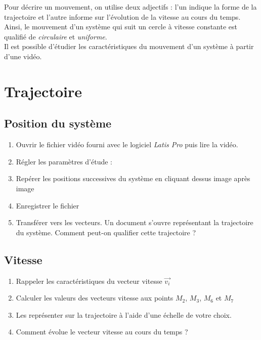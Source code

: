 \documentclass[a4paper,11pt,fleqn]{article}%
\begin{document}
\maketitle

Pour décrire un mouvement, on utilise deux adjectifs : l'un indique la forme de la trajectoire et l'autre informe sur l'évolution de la vitesse au cours du temps. Ainsi, le mouvement d'un système qui suit un cercle à vitesse constante est qualifié de \textit{circulaire} et \textit{uniforme}.\\ Il est possible d'étudier les caractéristiques du mouvement d'un système à partir d'une vidéo.
\section{Trajectoire}
	\subsection*{Position du système}
	\begin{enumerate}
		\item Ouvrir le fichier vidéo fourni avec le logiciel \textit{Latis Pro} puis lire la vidéo.
		\item Régler les paramètres d'étude :
		\item Repérer les positions successives du système en cliquant dessus image après image
		\item Enregistrer le fichier
		\item Transférer vers les vecteurs. Un document s'ouvre représentant la trajectoire du système. Comment peut-on qualifier cette trajectoire ?
	\end{enumerate}
	\subsection*{Vitesse}
	\begin{enumerate}[resume]
	\item Rappeler les caractéristiques du vecteur vitesse $\vec{v_i}$
	\item Calculer les valeurs des vecteurs vitesse aux points $M_2$, $M_3$, $M_6$ et $M_7$
	\item Les représenter sur la trajectoire à l'aide d'une échelle de votre choix.
	\item Comment évolue le vecteur vitesse au cours du temps ?
	\end{enumerate}
\end{document}
